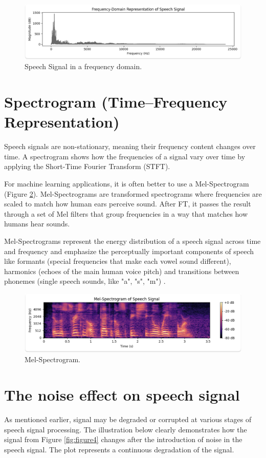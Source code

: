 \begin{figure}[htbp]
    \centering
    \includegraphics[width=.8\linewidth]{figures/figure8_1_fd.jpg}
    \caption{Speech Signal in a frequency domain.}
    \label{fig:figure2}
\end{figure}


\section{Spectrogram (Time–Frequency Representation)}

Speech signals are non-stationary, meaning their frequency content changes over time.
A spectrogram shows how the frequencies of a signal vary over time by applying the Short-Time Fourier Transform (STFT).

For machine learning applications, it is often better to use a Mel-Spectrogram (Figure \ref{fig:figure3}). Mel-Spectrograms are transformed spectrograms where frequencies are scaled to match how human ears perceive sound. After FT, it passes the result through a set of Mel filters that group frequencies in a way that matches how humans hear sounds.

Mel-Spectrograms represent the energy distribution of a speech signal across time and frequency and emphasize the perceptually important components of speech like formants (special frequencies that make each vowel sound different), harmonics (echoes of the main human voice pitch) and transitions between phonemes (single speech sounds, like "a", "s", "m") \cite{luitel2024audio}.


\begin{figure}[htbp]
    \centering
    \includegraphics[width=.8\linewidth]{figures/mel-spectrogram.jpg}
    \caption{Mel-Spectrogram.}
    \label{fig:figure3}
\end{figure}


\section{The noise effect on speech signal}
As mentioned earlier, signal may be degraded or corrupted at various stages of speech signal processing. The illustration below clearly demonstrates how the signal from Figure \ref{fig:figure4} changes after the introduction of noise in the speech signal. The plot represents a continuous degradation of the signal.

